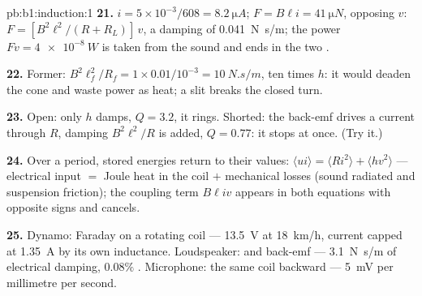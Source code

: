 \begin{solution}{pb:b1:induction:1}
\textbf{21.} $i = 5 \times 10^{-3}/608 = \qty{8.2}{\micro A}$; $F = B\ell i = \qty{41}{\micro N}$,
opposing $v$: $F = [B^2\ell^2/(R + R_L)]\,v$, a damping of \qty{0.041}{N.s/m};
the power $Fv = \qty{4e-8}{W}$ is taken from the sound and ends in the
two .

\textbf{22.} Former: $B^2\ell_f^2/R_f = 1 \times 0.01/10^{-3} = \qty{10}{N.s/m}$, ten
times $h$: it would deaden the cone and waste power as heat; a slit
breaks the closed turn.

\textbf{23.} Open: only $h$ damps, $Q = 3.2$, it rings. Shorted: the
back-emf drives a current through $R$, damping $B^2\ell^2/R$ is added,
$Q = 0.77$: it stops at once. (Try it.)

\textbf{24.} Over a period, stored energies return to their values:
$\langle ui\rangle = \langle Ri^2\rangle + \langle hv^2\rangle$ --- electrical input $=$
Joule heat in the coil $+$ mechanical losses (sound radiated and
suspension friction); the coupling term $B\ell iv$ appears in both
equations with opposite signs and cancels.

\textbf{25.} Dynamo: Faraday on a rotating coil --- \qty{13.5}{V} at
\qty{18}{km/h}, current capped at \qty{1.35}{A} by its own inductance.
Loudspeaker:  and back-emf --- \qty{3.1}{N.s/m} of electrical
damping, $0.08\%$ . Microphone: the same coil backward ---
\qty{5}{mV} per millimetre per second.
\end{solution}
